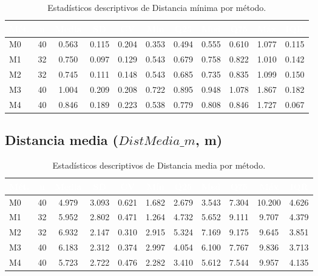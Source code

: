 \documentclass[12pt,a4paper,oneside]{book}
\begin{document}
\begin{table}[H]
\centering
\caption{Estadísticos descriptivos de Distancia mínima por método.}
\renewcommand{\arraystretch}{1.25}
\small
\begin{tabular}{lcccccccccc}
\toprule
\rowcolor{primary}
\textcolor{white}{\textbf{Mét.}} & \textcolor{white}{\textbf{n}} & \textcolor{white}{\textbf{Media}} & \textcolor{white}{\textbf{SD}} & \textcolor{white}{\textbf{CV}} & \textcolor{white}{\textbf{Mín}} & \textcolor{white}{\textbf{Q25}} & \textcolor{white}{\textbf{Med}} & \textcolor{white}{\textbf{Q75}} & \textcolor{white}{\textbf{Máx}} & \textcolor{white}{\textbf{IQR}} \\
\midrule
M0 & 40 & 0.563 & 0.115 & 0.204 & 0.353 & 0.494 & 0.555 & 0.610 & 1.077 & 0.115 \\
M1 & 32 & 0.750 & 0.097 & 0.129 & 0.543 & 0.679 & 0.758 & 0.822 & 1.010 & 0.142 \\
M2 & 32 & 0.745 & 0.111 & 0.148 & 0.543 & 0.685 & 0.735 & 0.835 & 1.099 & 0.150 \\
M3 & 40 & 1.004 & 0.209 & 0.208 & 0.722 & 0.895 & 0.948 & 1.078 & 1.867 & 0.182 \\
M4 & 40 & 0.846 & 0.189 & 0.223 & 0.538 & 0.779 & 0.808 & 0.846 & 1.727 & 0.067 \\
\bottomrule
\end{tabular}
\end{table}

\subsection{Distancia media ($\textit{DistMedia\_m}$, m)}

\begin{table}[H]
\centering
\caption{Estadísticos descriptivos de Distancia media por método.}
\renewcommand{\arraystretch}{1.25}
\small
\begin{tabular}{lcccccccccc}
\toprule
\rowcolor{primary}
\textcolor{white}{\textbf{Mét.}} & \textcolor{white}{\textbf{n}} & \textcolor{white}{\textbf{Media}} & \textcolor{white}{\textbf{SD}} & \textcolor{white}{\textbf{CV}} & \textcolor{white}{\textbf{Mín}} & \textcolor{white}{\textbf{Q25}} & \textcolor{white}{\textbf{Med}} & \textcolor{white}{\textbf{Q75}} & \textcolor{white}{\textbf{Máx}} & \textcolor{white}{\textbf{IQR}} \\
\midrule
M0 & 40 & 4.979 & 3.093 & 0.621 & 1.682 & 2.679 & 3.543 & 7.304 & 10.200 & 4.626 \\
M1 & 32 & 5.952 & 2.802 & 0.471 & 1.264 & 4.732 & 5.652 & 9.111 & 9.707 & 4.379 \\
M2 & 32 & 6.932 & 2.147 & 0.310 & 2.915 & 5.324 & 7.169 & 9.175 & 9.645 & 3.851 \\
M3 & 40 & 6.183 & 2.312 & 0.374 & 2.997 & 4.054 & 6.100 & 7.767 & 9.836 & 3.713 \\
M4 & 40 & 5.723 & 2.722 & 0.476 & 2.282 & 3.410 & 5.612 & 7.544 & 9.957 & 4.135 \\
\bottomrule
\end{tabular}
\end{table}
\end{document}
